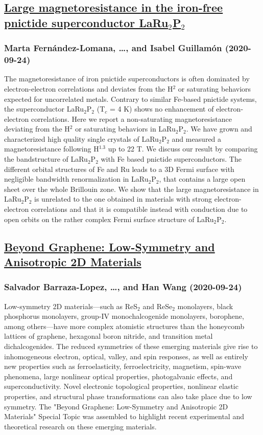 \subsection*{\href{http://arxiv.org/abs/2009.11585v1}{Large magnetoresistance in the iron-free pnictide superconductor  LaRu$_2$P$_2$}}
\subsubsection*{Marta Fernández-Lomana, \dots, and Isabel Guillamón (2020-09-24)}
The magnetoresistance of iron pnictide superconductors is often dominated by
electron-electron correlations and deviates from the H$^2$ or saturating
behaviors expected for uncorrelated metals. Contrary to similar Fe-based
pnictide systems, the superconductor LaRu$_2$P$_2$ (T$_c$ = 4 K) shows no
enhancement of electron-electron correlations. Here we report a non-saturating
magnetoresistance deviating from the H$^2$ or saturating behaviors in
LaRu$_2$P$_2$. We have grown and characterized high quality single crystals of
LaRu$_2$P$_2$ and measured a magnetoresistance following H$^{1.3}$ up to 22 T.
We discuss our result by comparing the bandstructure of LaRu$_2$P$_2$ with Fe
based pnictide superconductors. The different orbital structures of Fe and Ru
leads to a 3D Fermi surface with negligible bandwidth renormalization in
LaRu$_2$P$_2$, that contains a large open sheet over the whole Brillouin zone.
We show that the large magnetoresistance in LaRu$_2$P$_2$ is unrelated to the
one obtained in materials with strong electron-electron correlations and that
it is compatible instead with conduction due to open orbits on the rather
complex Fermi surface structure of LaRu$_2$P$_2$.

\subsection*{\href{http://arxiv.org/abs/2009.11584v1}{Beyond Graphene: Low-Symmetry and Anisotropic 2D Materials}}
\subsubsection*{Salvador Barraza-Lopez, \dots, and Han Wang (2020-09-24)}
Low-symmetry 2D materials---such as ReS$_2$ and ReSe$_2$ monolayers, black
phosphorus monolayers, group-IV monochalcogenide monolayers, borophene, among
others---have more complex atomistic structures than the honeycomb lattices of
graphene, hexagonal boron nitride, and transition metal dichalcogenides. The
reduced symmetries of these emerging materials give rise to inhomogeneous
electron, optical, valley, and spin responses, as well as entirely new
properties such as ferroelasticity, ferroelectricity, magnetism, spin-wave
phenomena, large nonlinear optical properties, photogalvanic effects, and
superconductivity. Novel electronic topological properties, nonlinear elastic
properties, and structural phase transformations can also take place due to low
symmetry. The "Beyond Graphene: Low-Symmetry and Anisotropic 2D Materials"
Special Topic was assembled to highlight recent experimental and theoretical
research on these emerging materials.

